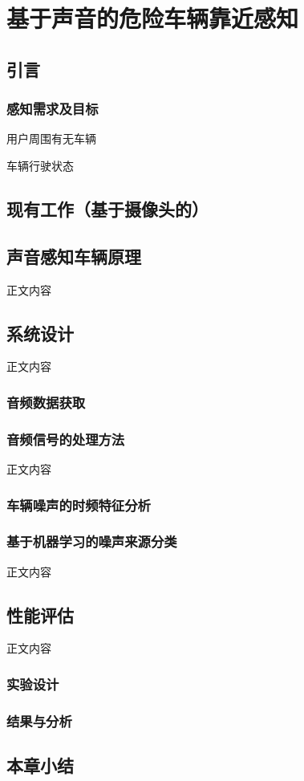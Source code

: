 \chapter{基于声音的危险车辆靠近感知}
\section{引言}

\subsection{感知需求及目标}

用户周围有无车辆

车辆行驶状态

\section{现有工作（基于摄像头的）}

\section{声音感知车辆原理}
正文内容

\section{系统设计}
正文内容
\subsection{音频数据获取}

\subsection{音频信号的处理方法}
正文内容
\subsection{车辆噪声的时频特征分析}

\subsection{基于机器学习的噪声来源分类}
正文内容

\section{性能评估}
正文内容
\subsection{实验设计}
\subsection{结果与分析}

\section{本章小结}